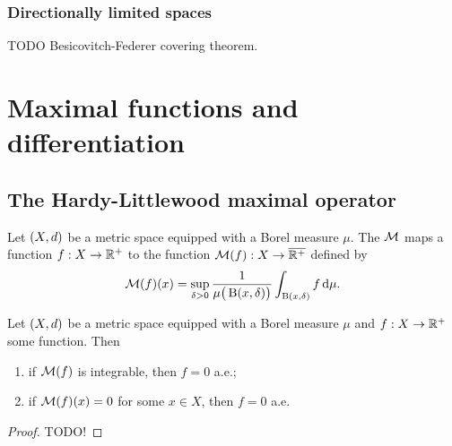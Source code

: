 \subsubsection{Directionally limited spaces}

TODO Besicovitch-Federer covering theorem.

\section{Maximal functions and differentiation}
\subsection{The Hardy-Littlewood maximal operator}
\begin{definition}
Let $\sSet{X,d}$ be a metric space equipped with a Borel measure $\mu$. The  $\operatorname{\mathcal{M}}$ maps a function $f: X\to \mathbb{R}^+$ to the function $\operatorname{\mathcal{M}}(f): X\to \overline{\mathbb{R}^+}$ defined by
\[ \operatorname{\mathcal{M}}(f)(x) = \sup_{\delta >0}\frac{1}{\mu\big(\operatorname{B}(x,\delta)\big)}\int_{\operatorname{B}(x,\delta)} f \operatorname{d \!}{\mu}. \]
\end{definition}

\begin{proposition}
Let $\sSet{X,d}$ be a metric space equipped with a Borel measure $\mu$ and $f: X\to \mathbb{R}^+$ some function. Then
\begin{enumerate}
\item if $\operatorname{\mathcal{M}}(f)$ is integrable, then $f = 0$ a.e.;
\item if $\operatorname{\mathcal{M}}(f)(x) = 0$ for some $x\in X$, then $f=0$ a.e. 
\end{enumerate}
\end{proposition}
\begin{proof}
TODO!
\end{proof}

